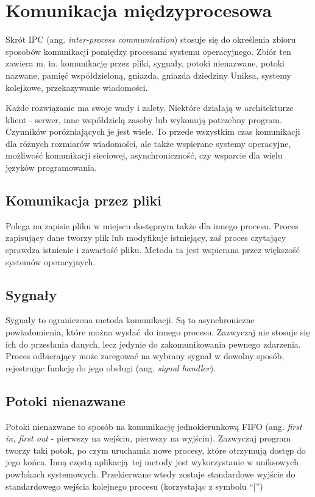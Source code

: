 \chapter{Komunikacja międzyprocesowa}

Skrót IPC (ang. \textit{inter-process communication}) stosuje się do określenia zbioru sposobów komunikacji pomiędzy procesami systemu operacyjnego. Zbiór ten zawiera m. in. komunikację przez pliki, sygnały, potoki nienazwane, potoki nazwane, pamięć współdzieloną, gniazda, gniazda dziedziny Uniksa, systemy kolejkowe, przekazywanie wiadomości.

Każde rozwiązanie ma swoje wady i zalety. Niektóre działają w architekturze klient - serwer, inne współdzielą zasoby lub wykonują potrzebny program. Czynników poróżniających je jest wiele. To przede wszystkim czas komunikacji dla różnych rozmiarów wiadomości, ale także wspierane systemy operacyjne, możliwość komunikacji sieciowej, asynchroniczność, czy wsparcie dla wielu języków programowania.


\section{Komunikacja przez pliki}

Polega na zapisie pliku w miejscu dostępnym także dla innego procesu. Proces zapisujący dane tworzy plik lub modyfikuje istniejący, zaś proces czytający sprawdza istnienie i zawartość pliku. Metoda ta jest wspierana przez większość systemów operacyjnych.


\section{Sygnały}

Sygnały to ograniczona metoda komunikacji. Są to asynchroniczne powiadomienia, które można wysłać do innego procesu. Zazwyczaj nie stosuje się ich do przesłania danych, lecz jedynie do zakomunikowania pewnego zdarzenia. Proces odbierający może zaregować na wybrany sygnał w dowolny sposób, rejestrując funkcję do jego obsługi (ang. \textit{signal handler}).


\section{Potoki nienazwane}

Potoki nienazwane to sposób na komunikację jednokierunkową FIFO (ang. \textit{first in, first out} - pierwszy na wejściu, pierwszy na wyjściu). Zazwyczaj program tworzy taki potok, po czym uruchamia nowe procesy, które otrzymują dostęp do jego końca. Inną częstą aplikacją tej metody jest wykorzystanie w uniksowych powłokach systemowych. Przekierwane wtedy zostaje standardowe wyjście do standardowego wejścia kolejnego procesu (korzystając z symbolu \enquote{|})


